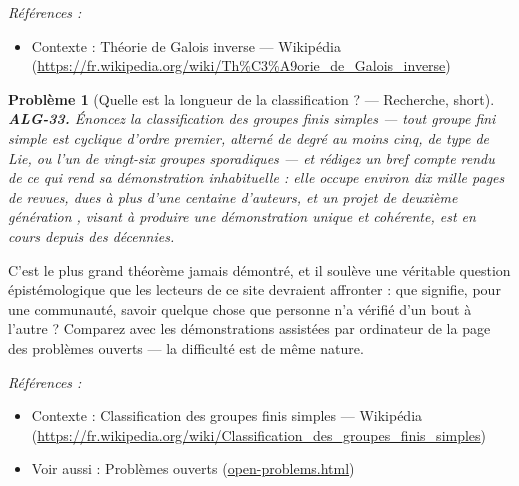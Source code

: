 \documentclass[11pt]{article}
\newtheorem{problem}{Problème}
\newenvironment{refs}{\par\small\noindent\emph{Références :}\begin{itemize}\setlength\itemsep{0pt}}{\end{itemize}\normalsize}
\begin{document}
\begin{refs}
\item Contexte : Théorie de Galois inverse --- Wikipédia (\url{https://fr.wikipedia.org/wiki/Th%C3%A9orie_de_Galois_inverse})
\end{refs}

\bigskip

\begin{problem}[{Quelle est la longueur de la classification ? --- Recherche, short}]
\textbf{ALG-33.} Énoncez la classification des groupes finis simples --- tout groupe fini simple est cyclique d'ordre premier, alterné de degré au moins cinq, de type de Lie, ou l'un de vingt-six groupes sporadiques --- et rédigez un bref compte rendu de ce qui rend sa démonstration inhabituelle : elle occupe environ dix mille pages de revues, dues à plus d'une centaine d'auteurs, et un projet de \og{} deuxième génération \fg{}, visant à produire une démonstration unique et cohérente, est en cours depuis des décennies.
\end{problem}

\noindent C'est le plus grand théorème jamais démontré, et il soulève une véritable question épistémologique que les lecteurs de ce site devraient affronter : que signifie, pour une communauté, savoir quelque chose que personne n'a vérifié d'un bout à l'autre ? Comparez avec les démonstrations assistées par ordinateur de la page des problèmes ouverts --- la difficulté est de même nature.

\begin{refs}
\item Contexte : Classification des groupes finis simples --- Wikipédia (\url{https://fr.wikipedia.org/wiki/Classification_des_groupes_finis_simples})
\item Voir aussi : Problèmes ouverts (\url{open-problems.html})
\end{refs}

\bigskip
\end{document}

